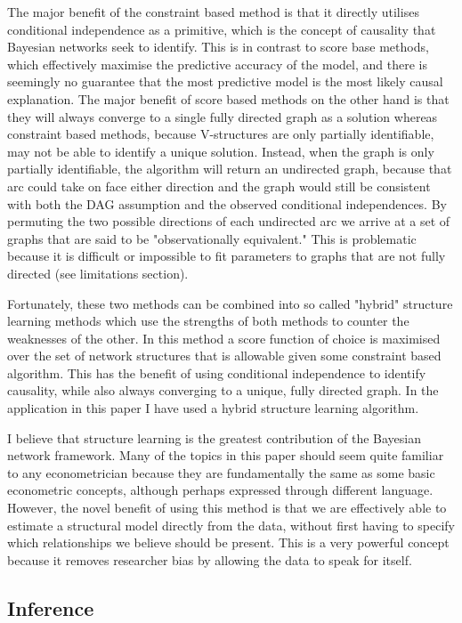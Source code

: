 \documentclass{article}
\begin{document}
The major benefit of the constraint based method is that it directly utilises conditional independence as a primitive, which is the concept of causality that Bayesian networks seek to identify. This is in contrast to score base methods, which effectively maximise the predictive accuracy of the model, and there is seemingly no guarantee that the most predictive model is the most likely causal explanation. The major benefit of score based methods on the other hand is that they will always converge to a single fully directed graph as a solution whereas constraint based methods, because V-structures are only partially identifiable, may not be able to identify a unique solution. Instead, when the graph is only partially identifiable, the algorithm will return an undirected graph, because that arc could take on face either direction and the graph would still be consistent with both the DAG assumption and the observed conditional independences. By permuting the two possible directions of each undirected arc we arrive at a set of graphs that are said to be "observationally equivalent." This is problematic because it is difficult or impossible to fit parameters to graphs that are not fully directed (see limitations section).  

Fortunately, these two methods can be combined into so called "hybrid" structure learning methods which use the strengths of both methods to counter the weaknesses of the other. In this method a score function of choice is maximised over the set of network structures that is allowable given some constraint based algorithm. This has the benefit of using conditional independence to identify causality, while also always converging to a unique, fully directed graph. In the application in this paper I have used a hybrid structure learning algorithm.

I believe that structure learning is the greatest contribution of the Bayesian network framework. Many of the topics in this paper should seem quite familiar to any econometrician because they are fundamentally the same as some basic econometric concepts, although perhaps expressed through different language. However, the novel benefit of using this method is that we are effectively able to estimate a structural model directly from the data, without first having to specify which relationships we believe should be present. This is a very powerful concept because it removes researcher bias by allowing the data to speak for itself.

\subsection{Inference} \label{inference}
\end{document}
